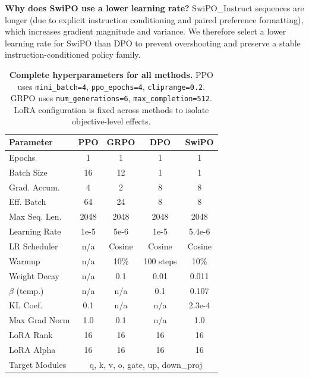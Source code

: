 \vspace{-0.25em}
\noindent
\textbf{Why does SwiPO use a lower learning rate?}
SwiPO\_Instruct sequences are longer (due to explicit instruction conditioning and paired preference formatting), which increases gradient magnitude and variance.
We therefore select a lower learning rate for SwiPO than \textsc{DPO} to prevent overshooting and preserve a stable instruction-conditioned policy family.

\begin{table}[ht!]
\centering
\normalsize
\setlength{\tabcolsep}{2pt}
\renewcommand{\arraystretch}{1.8}
\begin{tabular}{@{}lcccc@{}}
\toprule
\textbf{Parameter} & \textbf{PPO} & \textbf{GRPO} & \textbf{DPO} & \textbf{SwiPO} \\
\midrule
Epochs & 1 & 1 & 1 & 1 \\ \hline
Batch Size & 16 & 12 & 1 & 1 \\ \hline
Grad. Accum. & 4 & 2 & 8 & 8 \\ \hline
Eff. Batch & 64 & 24 & 8 & 8 \\ \hline
Max Seq. Len. & 2048 & 2048 & 2048 & 2048 \\ \hline
Learning Rate & 1e-5 & 5e-6 & 1e-5 & 5.4e-6 \\ \hline
LR Scheduler & n/a & Cosine & Cosine & Cosine \\ \hline
Warmup & n/a & 10\% & 100 steps & 10\% \\ \hline
Weight Decay & n/a & 0.1 & 0.01 & 0.011 \\ \hline
$\beta$ (temp.) & n/a & n/a & 0.1 & 0.107 \\ \hline
KL Coef. & 0.1 & n/a & n/a & 2.3e-4 \\ \hline
Max Grad Norm & 1.0 & 0.1 & n/a & 1.0 \\ \hline
LoRA Rank & 16 & 16 & 16 & 16 \\ \hline
LoRA Alpha & 16 & 16 & 16 & 16 \\ \hline
Target Modules & \multicolumn{4}{c}{q, k, v, o, gate, up, down\_proj} \\
\bottomrule
\end{tabular}
\caption{\textbf{Complete hyperparameters for all methods.} PPO uses \texttt{mini\_batch=4}, \texttt{ppo\_epochs=4}, \texttt{cliprange=0.2}. GRPO uses \texttt{num\_generations=6}, \texttt{max\_completion=512}. LoRA configuration is fixed across methods to isolate objective-level effects.}
\label{tab:full_hyperparams}
\end{table}

